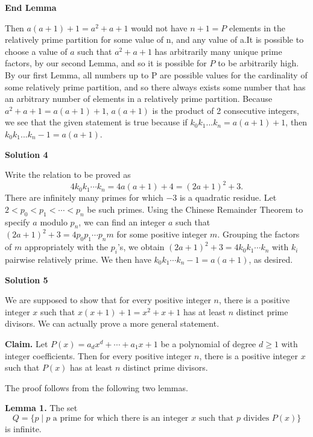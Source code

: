\begin{enumerate}
 \textbf{End Lemma}

 Then $a(a + 1) + 1 = a^2 + a + 1$ would not have $n + 1 = P$ elements in the relatively prime partition for some value of n, and any value of a.It is possible to choose a value of $a$ such that $a^2 + a + 1$ has arbitrarily many unique prime factors, by our second Lemma, and so it is possible for $P$ to be arbitrarily high. By our first Lemma, all numbers up to P are possible values for the cardinality of some relatively prime partition, and so there always exists some number that has an arbitrary number of elements in a relatively prime partition. Because $a^2 + a + 1 = a(a + 1) + 1$, $a(a + 1)$ is the product of 2 consecutive integers, we see that the given statement is true because if $k_0k_1...k_n = a(a + 1) + 1$, then $k_0k_1...k_n - 1 = a(a + 1)$.

 



\textbf{Solution 4}

Write the relation to be proved as
 \[4k_0k_1\cdots k_n = 4a(a + 1) + 4 = (2a + 1)^2 + 3.\]There are infinitely many primes for which $-3$ is a quadratic residue. Let $2 < p_0 < p_1 < \cdots < p_n$ be such primes. Using the Chinese Remainder Theorem to specify $a$ modulo $p_n$, we can find an integer $a$ such that $(2a + 1)^2 + 3 = 4p_0p_1\cdots p_nm$ for some positive integer $m$. Grouping the factors of $m$ appropriately with the $p_i$'s, we obtain $(2a + 1)^2 + 3 = 4k_0k_1\cdots k_n$ with $k_i$ pairwise relatively prime. We then have $k_0k_1\cdots k_n - 1 = a(a + 1)$, as desired.

 



\textbf{Solution 5}

We are supposed to show that for every positive integer $n$, there is a positive integer $x$ such that $x(x + 1) + 1 = x^2 + x + 1$ has at least $n$ distinct prime divisors. We can actually prove a more general statement.

 \textbf{Claim.} Let $P(x) = a_dx^d + \cdots + a_1x + 1$ be a polynomial of degree $d\geq 1$ with integer coefficients. Then for every positive integer $n$, there is a positive integer $x$ such that $P(x)$ has at least $n$ distinct prime divisors.

 The proof follows from the following two lemmas.

 \textbf{Lemma 1.} The set
 \[Q = \{p\mid p\text{ a prime for which there is an integer }x\text{ such that }p\text{ divides }P(x)\}\]is infinite.


\end{enumerate}
